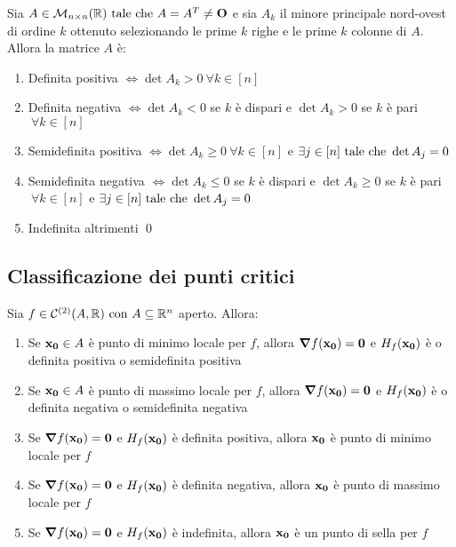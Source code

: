 \begin{theorem}
    Sia $A \in \mathcal{M}_{n\times n}(\mathbb{R}) \text{ tale che } A=A^T\neq \vb{O}$ e sia $A_k$ il minore principale nord-ovest di ordine $k$ ottenuto selezionando le prime $k$ righe e le prime $k$ colonne di $A$. Allora la matrice $A$ è:
    \begin{enumerate}
        \item Definita positiva $\iff \det A_k > 0 \ \forall k \in [n]$
        \item Definita negativa $\iff \det A_k < 0$ se $k$ è dispari e $\det A_k > 0$ se $k$ è pari $ \ \forall k \in [n]$
        \item Semidefinita positiva $\iff \det A_k \geq 0 \ \forall k \in [n]$ e $\exists j \in [n] \text{ tale che } \det A_j = 0$
        \item Semidefinita negativa $\iff \det A_k \leq 0$ se $k$ è dispari e $\det A_k \geq 0$ se $k$ è pari $ \ \forall k \in [n]$ e $\exists j \in [n] \text{ tale che } \det A_j=0$
        \item Indefinita altrimenti
        \qed
    \end{enumerate}
\end{theorem}

\subsection{Classificazione dei punti critici}

\begin{theorem}
    Sia $f \in \mathcal{C}^{(2)}(A, \mathbb{R}) \text{ con } A\subseteq \mathbb{R}^n$ aperto. Allora:
    \begin{enumerate}
        \item Se $\vb{x_0} \in A$ è punto di minimo locale per $f$, allora $\grad f(\vb{x_0})=\vb{0}$ e $H_f(\vb{x_0})$ è o definita positiva o semidefinita positiva
        \item Se $\vb{x_0} \in A$ è punto di massimo locale per $f$, allora $\grad f(\vb{x_0})=\vb{0}$ e $H_f(\vb{x_0})$ è o definita negativa o semidefinita negativa
        \item Se $\grad f(\vb{x_0})=\vb{0}$ e $H_f(\vb{x_0})$ è definita positiva, allora $\vb{x_0}$ è punto di minimo locale per $f$
        \item Se $\grad f(\vb{x_0})=\vb{0}$ e $H_f(\vb{x_0})$ è definita negativa, allora $\vb{x_0}$ è punto di massimo locale per $f$
        \item Se $\grad f(\vb{x_0})=\vb{0}$ e $H_f(\vb{x_0})$ è indefinita, allora $\vb{x_0}$ è un punto di sella per $f$
    \end{enumerate}
\end{theorem}

